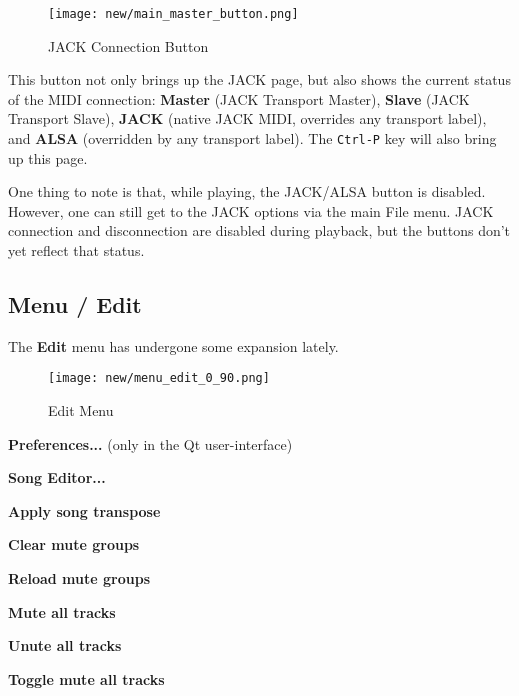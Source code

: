 \begin{figure}[H]
   \centering 
   \texttt{[image: new/main\_master\_button.png]}
   \caption{JACK Connection Button}
   \label{fig:seq64_main_master_button}
\end{figure}

   This button not only brings up the JACK page, but also shows the current
   status of the MIDI connection:
   \textbf{Master} (JACK Transport Master),
   \textbf{Slave} (JACK Transport Slave),
   \textbf{JACK} (native JACK MIDI, overrides any transport label),
   and \textbf{ALSA} (overridden by any transport label).
   The \texttt{Ctrl-P} key will also bring up this page.

   One thing to note is that, while playing, the JACK/ALSA button is disabled.
   However, one can still get to the JACK options via the main File menu.
   JACK connection and disconnection are disabled during playback, but the
   buttons don't yet reflect that status.

\subsection{Menu / Edit}
\label{subsec:seq64_menu_edit}

   The \textbf{Edit} menu has undergone some expansion lately.

\begin{figure}[H]
   \centering 
   \texttt{[image: new/menu\_edit\_0\_90.png]}
   \caption{Edit Menu}
   \label{fig:seq64_menu_edit_0_90}
\end{figure}

   \begin{enumber}
      \item \textbf{Preferences...} (only in the Qt user-interface)
      \item \textbf{Song Editor...}
      \item \textbf{Apply song transpose}
      \item \textbf{Clear mute groups}
      \item \textbf{Reload mute groups}
      \item \textbf{Mute all tracks}
      \item \textbf{Unute all tracks}
      \item \textbf{Toggle mute all tracks}
   \end{enumber}

